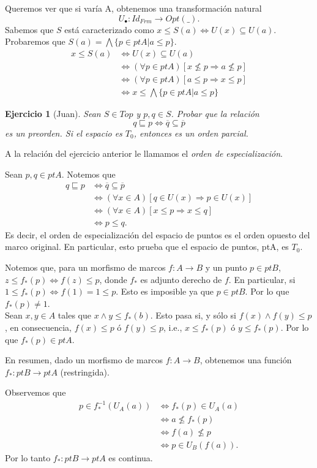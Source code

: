 \documentclass[12pt,letterpaper,titlepage]{article}
\newtheorem{exe}{Ejercicio}
\theoremstyle{definition}
\renewcommand\inf{\wedge}
\newcommand\Inf{\bigwedge}
\newcommand\<{\langle}
\renewcommand\>{\rangle}
\begin{document}
Queremos ver que si varía A, obtenemos una transformación natural
\[U_\bullet\colon Id_{Frm}\to Opt(\_).\]
Sabemos que $S$ está caracterizado como $x\leq S(a) \iff U(x)\subseteq U(a)$. Probaremos que $S(a)=\Inf \{p\in ptA|a\leq p\}$.
\begin{align*}
    x\leq S(a) &\iff U(x)\subseteq U(a)\\
    &\iff (\forall p\in ptA)[x\not\leq p\Rightarrow a\not\leq p]\\
    &\iff (\forall p\in ptA)[a\leq p \Rightarrow x\leq p]\\
    &\iff x\leq \Inf \{p\in ptA|a\leq p\}
\end{align*}
\begin{exe}[Juan]
  Sean $S\in Top$ y $p,q\in S$. Probar que la relación
  \[q\sqsubseteq p\iff \overline{q}\subseteq \overline{p}\]
  es un preorden. Si el espacio es $T_0$, entonces es un orden parcial.
\end{exe}
\noindent A la relación del ejercicio anterior le llamamos el \textit{orden de especialización}.\par 
Sean $p,q\in ptA$. Notemos que
\begin{align*}
    q\sqsubseteq p&\iff \overline{q}\subseteq \overline{p}\\
    &\iff (\forall x\in A)[q\in U(x)\Rightarrow p\in U(x)]\\
    &\iff (\forall x\in A)[x\leq p\Rightarrow x\leq q]\\
    &\iff p\leq q.
\end{align*}
Es decir, el orden de especialización del espacio de puntos es el orden opuesto del marco original. En particular, esto prueba que el espacio de puntos, ptA, es $T_0$.\par 
Notemos que, para un morfismo de marcos $f\colon A\to B$ y un punto $p\in ptB$, $z\leq f_\ast (p)\iff f(z)\leq p$, donde $f_\ast$ es adjunto derecho de $f$. En particular, si $1\leq f_\ast(p)\iff f(1)=1\leq p$. Esto es imposible ya que $p\in ptB$. Por lo que $f_\ast(p)\neq 1$.\\
Sean $x,y\in A$ tales que $x\inf y\leq f_\ast(b)$. Esto pasa si, y sólo si $f(x)\inf f(y)\leq p$, en consecuencia, $f(x)\leq p$ ó $f(y)\leq p$, i.e., $x\leq f_\ast (p)$ ó $y\leq f_\ast (p)$. Por lo que $f_\ast (p)\in ptA$.\par 
En resumen, dado un morfismo de marcos $f\colon A\to B$, obtenemos una función $f_\ast \colon ptB\to ptA$ (restringida).\par
Observemos que
\begin{align*}
    p\in f^{-1}_\ast \left(U_A(a)\right)&\iff f_\ast (p)\in U_A(a)\\
    &\iff a\not\leq f_\ast (p)\\
    &\iff f(a)\not\leq p\\
    &\iff p\in U_B\left(f(a)\right).
\end{align*}
Por lo tanto $f_\ast\colon ptB\to ptA$ es continua.
\end{document}
